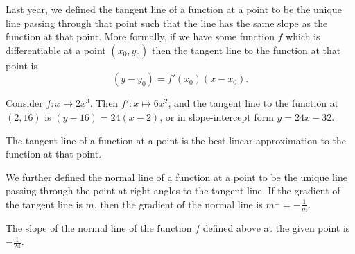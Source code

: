 


Last year, we defined the tangent line of a function at a point to be the unique line
passing through that point such that the line has the same slope as the function at that
point. More formally, if we have some function $ f $ which is differentiable at a point $ (x_0, y_0) $
then the tangent line to the function at that point is
\begin{displaymath}
  (y - y_0) = f'(x_0) (x - x_0).
\end{displaymath}

\begin{ex}
  Consider $ f : x \mapsto 2x^3 $. Then $ f' : x \mapsto 6x^2 $, and the tangent line
  to the function at $ (2, 16) $ is $ (y - 16) = 24(x - 2) $, or in slope-intercept
  form $ y = 24x - 32 $.

  \begin{center}
  \end{center}
\end{ex}

The tangent line of a function at a point is the best linear approximation to the function at that point.

We further defined the normal line of a function at a point to be the unique line passing through
the point at right angles to the tangent line. If the gradient of the tangent line is $ m $,
then the gradient of the normal line is $ m^\perp = -\frac{1}{m} $.

\begin{ex}
  The slope of the normal line of the function $ f $ defined above at the given point is $ -\frac{1}{24} $.
\end{ex}

